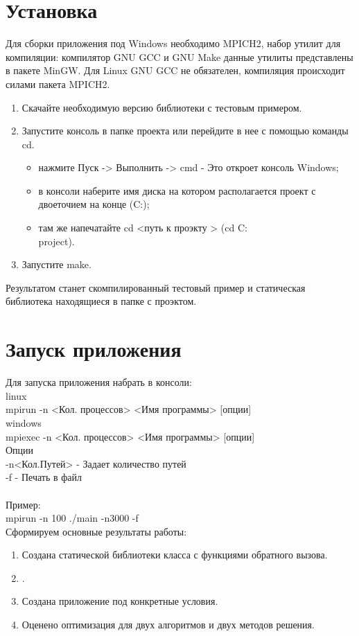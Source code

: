 \section{Установка}
Для сборки приложения под Windows необходимо MPICH2, набор утилит для компиляции: компилятор GNU GCC и GNU Make данные утилиты представлены в пакете MinGW. Для Linux GNU GCC не обязателен, компиляция происходит силами пакета MPICH2.
\begin{enumerate}
	\item Скачайте необходимую версию библиотеки с тестовым примером.
	\item Запустите консоль в папке проекта или перейдите в нее с помощью команды cd.
	\begin{itemize}
		\item нажмите Пуск -> Выполнить -> cmd - Это откроет консоль Windows;
		\item в консоли наберите имя диска на котором располагается проект с двоеточием на конце (C:);
		\item там же напечатайте cd <путь к проэкту > (cd C:\\project).
	\end{itemize}
	\item Запустите make.
\end{enumerate}
Результатом станет скомпилированный тестовый пример и статическая библиотека находящиеся в папке с проэктом.

\section{Запуск приложения}
Для запуска приложения набрать в консоли:\\
linux\\
	mpirun -n <Кол. процессов> <Имя программы> [опции]\\
windows\\
	mpiexec -n <Кол. процессов> <Имя программы> [опции]\\
Опции\\
-n<Кол.Путей> - Задает количество путей\\
-f  - Печать в файл\\
\\
Пример:\\
	mpirun -n 100 ./main -n3000 -f\\
\newpage{}
 Сформируем основные результаты работы:
 \begin{enumerate}
	\item Создана статической библиотеки класса с функциями обратного вызова.
	\item .
	\item Создана приложение под конкретные условия.
	\item Оценено оптимизация для двух алгоритмов и двух методов решения.
\end{enumerate}
